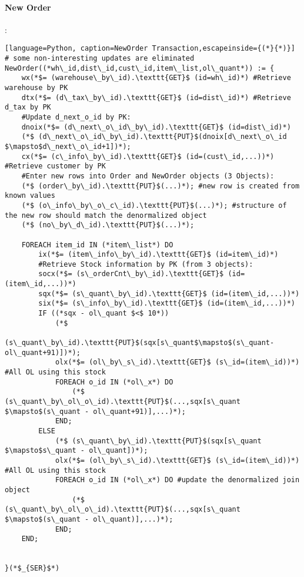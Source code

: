 \documentclass[12pt,letter]{article}
\begin{document}
\paragraph{New Order}:
\begin{lstlisting}[language=Python, caption=NewOrder Transaction,escapeinside={(*}{*)}]
# some non-interesting updates are eliminated
NewOrder((*wh\_id,dist\_id,cust\_id,item\_list,ol\_quant*)) := {	
	wx(*$= (warehouse\_by\_id).\texttt{GET}$ (id=wh\_id)*) #Retrieve warehouse by PK
	dtx(*$= (d\_tax\_by\_id).\texttt{GET}$ (id=dist\_id)*) #Retrieve d_tax by PK
	#Update d_next_o_id by PK:
	dnoix(*$= (d\_next\_o\_id\_by\_id).\texttt{GET}$ (id=dist\_id)*) 
	(*$ (d\_next\_o\_id\_by\_id).\texttt{PUT}$(dnoix[d\_next\_o\_id $\mapsto$d\_next\_o\_id+1])*);
	cx(*$= (c\_info\_by\_id).\texttt{GET}$ (id=(cust\_id,...))*) #Retrieve customer by PK
	#Enter new rows into Order and NewOrder objects (3 Objects):
	(*$ (order\_by\_id).\texttt{PUT}$(...)*); #new row is created from known values
	(*$ (o\_info\_by\_o\_c\_id).\texttt{PUT}$(...)*); #structure of the new row should match the denormalized object
	(*$ (no\_by\_d\_id).\texttt{PUT}$(...)*);
	
	FOREACH item_id IN (*item\_list*) DO
		ix(*$= (item\_info\_by\_id).\texttt{GET}$ (id=item\_id)*)
		#Retrieve Stock information by PK (from 3 objects):
		socx(*$= (s\_orderCnt\_by\_id).\texttt{GET}$ (id=(item\_id,...))*)
		sqx(*$= (s\_quant\_by\_id).\texttt{GET}$ (id=(item\_id,...))*)
		six(*$= (s\_info\_by\_id).\texttt{GET}$ (id=(item\_id,...))*)
		IF ((*sqx - ol\_quant $<$ 10*))
			(*$
			(s\_quant\_by\_id).\texttt{PUT}$(sqx[s\_quant$\mapsto$(s\_quant-ol\_quant+91)])*);		
			olx(*$= (ol\_by\_s\_id).\texttt{GET}$ (s\_id=(item\_id))*) #All OL using this stock
			FOREACH o_id IN (*ol\_x*) DO
				(*$ (s\_quant\_by\_ol\_o\_id).\texttt{PUT}$(...,sqx[s\_quant $\mapsto$(s\_quant - ol\_quant+91)],...)*);
			END;
		ELSE
			(*$ (s\_quant\_by\_id).\texttt{PUT}$(sqx[s\_quant $\mapsto$s\_quant - ol\_quant])*);		
			olx(*$= (ol\_by\_s\_id).\texttt{GET}$ (s\_id=(item\_id))*) #All OL using this stock
			FOREACH o_id IN (*ol\_x*) DO #update the denormalized join object
				(*$ (s\_quant\_by\_ol\_o\_id).\texttt{PUT}$(...,sqx[s\_quant $\mapsto$(s\_quant - ol\_quant)],...)*);
			END;
	END;


}(*$_{SER}$*)
\end{lstlisting}
\end{document}
